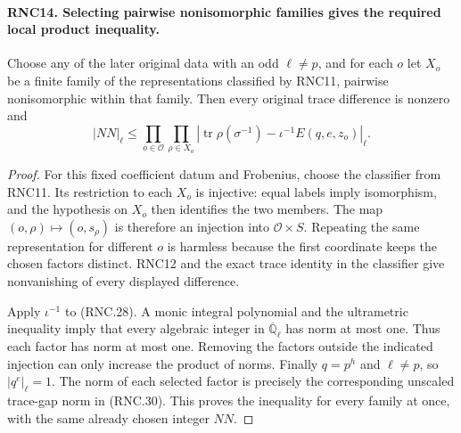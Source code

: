 \paragraph{RNC14. Selecting pairwise nonisomorphic families gives the required local product inequality.}
\label{claim:RNC14}
Choose any of the later original data with an odd
$\ell\ne p$, and for each $o$ let $X_o$ be a finite
family of the representations classified by RNC11,
pairwise nonisomorphic within that family.  Then every
original trace difference is nonzero and
\[
 |NN|_\ell\leq
 \prod_{o\in\mathcal O}\prod_{\rho\in X_o}
 \left|\operatorname{tr}\rho(\sigma^{-1})-
                         \iota^{-1}E(q,e,z_o)\right|_\ell.
                                                               \tag{RNC.30}
\]
\begin{proof}
For this fixed coefficient datum and Frobenius, choose
the classifier from RNC11.  Its restriction to each
$X_o$ is injective: equal labels imply isomorphism, and
the hypothesis on $X_o$ then identifies the two members.
The map $(o,\rho)\mapsto(o,s_\rho)$ is therefore an
injection into $\mathcal O\times S$.  Repeating the same
representation for different $o$ is harmless because
the first coordinate keeps the chosen factors distinct.
RNC12 and the exact trace identity in the classifier
give nonvanishing of every displayed difference.

Apply $\iota^{-1}$ to (RNC.28).  A monic integral
polynomial and the ultrametric inequality imply that
every algebraic integer in $\overline{\mathbb Q}_\ell$
has norm at most one.  Thus each factor has norm at most
one.  Removing the factors outside the indicated
injection can only increase the product of norms.
Finally $q=p^h$ and $\ell\ne p$, so $|q^e|_\ell=1$.
The norm of each selected factor is precisely the
corresponding unscaled trace-gap norm in (RNC.30).
This proves the inequality for every family at once,
with the same already chosen integer $NN$.
\end{proof}

